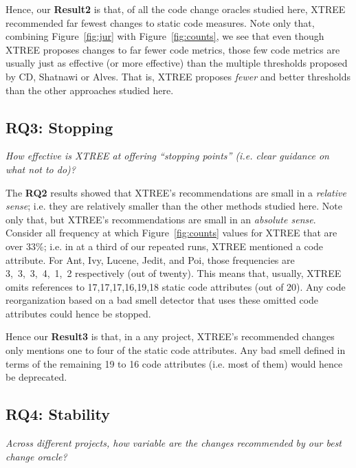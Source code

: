 \documentclass[twocolumn,5p]{elsarticle}
\newcommand{\fig}[1]{Figure~\ref{fig:#1}}
\theoremstyle{break}
\begin{document}
\begin{itemize}
		Hence, our {\bf Result2} is that, of all the code change oracles studied here, XTREE recommended far fewest changes to static code measures.
		Note only that,   combining  \fig{jur} with \fig{counts}, we   see that
		even though XTREE proposes changes to far fewer code metrics, those few
		code metrics are usually just as effective (or
		more effective) than the multiple
		thresholds
		proposed by CD, Shatnawi or Alves.  That is, XTREE proposes
		{\em fewer} and better thresholds than the other approaches studied here.
		
		
		
		\subsection{RQ3: Stopping}
		
		{\em  How effective is XTREE at offering   ``stopping points'' (i.e. clear guidance on what not to do)?}
		
		The {\bf RQ2} results showed that XTREE's recommendations are small in a {\em relative sense}; i.e. they are 
		relatively smaller than the other methods studied here.
		Note only that, but XTREE's recommendations are small in an {\em absolute sense}.
		Consider all frequency at which  \fig{counts} values for XTREE that are over 33\%; i.e. in at a third of our  repeated runs, XTREE mentioned
		a code attribute. For Ant, Ivy, Lucene, Jedit, and Poi, those frequencies
		are  \mbox{3, 3, 3, 4, 1, 2} respectively (out of twenty). This means that, usually, XTREE omits references to \mbox{17,17,17,16,19,18} static
		code attributes (out of 20). 
		Any code reorganization based on a bad smell detector that uses  these omitted code attributes could hence  be stopped.
		
		Hence our {\bf Result3} is that, in a any  project,  XTREE's  recommended  changes  only  mentions one to four 
		of the  static code attributes.  Any bad smell defined in terms of the remaining 19 to 16 code attributes (i.e. most of them)
		would hence be deprecated.
		
		
		\subsection{RQ4: Stability}
		
		{\em Across different projects, how variable are the changes recommended by our best change oracle? }
		

\end{itemize}
\end{document}
